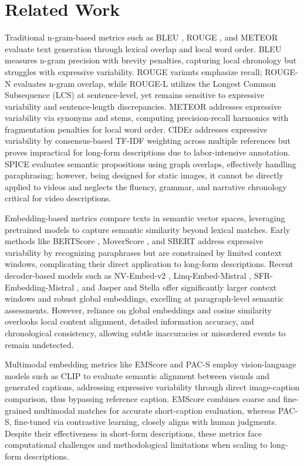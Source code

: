 \documentclass[letterpaper]{article} %
\begin{document}
\section{Related Work}

Traditional n-gram-based metrics such as BLEU \citep{p:02}, ROUGE \citep{l:04}, and METEOR \citep{bl:05} evaluate text generation through lexical overlap and local word order. BLEU measures n-gram precision with brevity penalties, capturing local chronology but struggles with expressive variability. ROUGE variants emphasize recall; ROUGE-N evaluates n-gram overlap, while ROUGE-L utilizes the Longest Common Subsequence (LCS) at sentence-level, yet remains sensitive to expressive variability and sentence-length discrepancies. METEOR addresses expressive variability via synonyms and stems, computing precision-recall harmonics with fragmentation penalties for local word order. CIDEr \citep{v:15} addresses expressive variability by consensus-based TF-IDF weighting across multiple references but proves impractical for long-form descriptions due to labor-intensive annotation. SPICE \citep{afjg:16} evaluates semantic propositions using graph overlaps, effectively handling paraphrasing; however, being designed for static images, it cannot be directly applied to videos and neglects the fluency, grammar, and narrative chronology critical for video descriptions.

Embedding-based metrics compare texts in semantic vector spaces, leveraging pretrained models to capture semantic similarity beyond lexical matches. Early methods like BERTScore \citep{z:20}, MoverScore \citep{z:19}, and SBERT \citep{r:19} address expressive variability by recognizing paraphrases but are constrained by limited context windows, complicating their direct application to long-form descriptions. Recent decoder-based models such as NV-Embed-v2 \citep{l:24}, Linq-Embed-Mistral \citep{cklg:24}, SFR-Embedding-Mistral \citep{mljx:24}, and Jasper and Stella \citep{zlw:24} offer significantly larger context windows and robust global embeddings, excelling at paragraph-level semantic assessments. However, reliance on global embeddings and cosine similarity overlooks local content alignment, detailed information accuracy, and chronological consistency, allowing subtle inaccuracies or misordered events to remain undetected.

Multimodal embedding metrics like EMScore \citep{syxl:22} and PAC-S \citep{sbc:23} employ vision-language models such as CLIP \citep{Radford2021LearningTV} to evaluate semantic alignment between visuals and generated captions, addressing expressive variability through direct image-caption comparison, thus bypassing reference caption. EMScore combines coarse and fine-grained multimodal matches for accurate short-caption evaluation, whereas PAC-S, fine-tuned via contrastive learning, closely aligns with human judgments. Despite their effectiveness in short-form descriptions, these metrics face computational challenges and methodological limitations when scaling to long-form descriptions.
\end{document}
